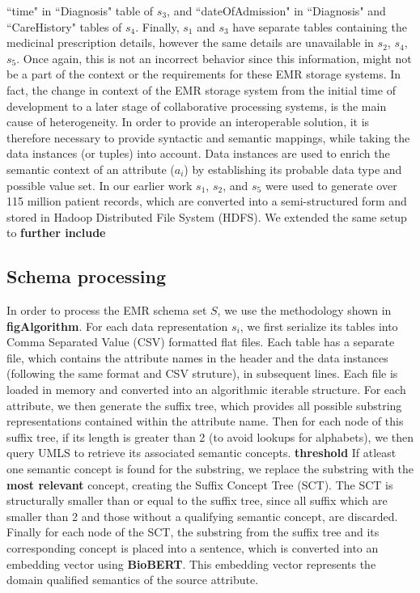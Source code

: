 ``time" in ``Diagnosis" table of $s_3$, and  ``dateOfAdmission" in ``Diagnosis" and ``CareHistory" tables of $s_4$.
Finally, $s_1$ and $s_3$ have separate tables containing the medicinal prescription details, however the same details are unavailable in $s_2$, $s_4$, $s_5$. Once again, this is not an incorrect behavior since this information, might not be a part of the context or the requirements for these EMR storage systems.
In fact, the change in context of the EMR storage system from the initial time of development to a later stage of collaborative processing systems, is the main cause of heterogeneity.
In order to provide an interoperable solution, it is therefore necessary to provide syntactic and semantic mappings, while taking the data instances (or tuples) into account. Data instances are used to enrich the semantic context of an attribute ($a_i$) by establishing its probable data type and possible value set. 
In our earlier work \cite{Satti2020} $s_1$, $s_2$, and $s_5$ were used to generate over 115 million patient records, which are converted into a semi-structured form and stored in Hadoop Distributed File System (HDFS). We extended the same setup to \textbf{further include}

\subsection*{Schema processing}
\label{schema_prepro}

In order to process the EMR schema set $S$, we use the methodology shown in \textbf{figAlgorithm}. For each data representation $s_i$, we first serialize its tables into Comma Separated Value (CSV) formatted flat files. Each table has a separate file, which contains the attribute names in the header and the data instances (following the same format and CSV struture), in subsequent lines. Each file is loaded in memory and converted into an algorithmic iterable structure. For each attribute, we then generate the suffix tree, which provides all possible substring representations contained within the attribute name. Then for each node of this suffix tree, if its length is greater than 2 (to avoid lookups for alphabets), we then query UMLS to retrieve its associated semantic concepts. \textbf{threshold}
If atleast one semantic concept is found for the substring, we replace the substring with the \textbf{most relevant} concept, creating the Suffix Concept Tree (SCT). The SCT is structurally smaller than or equal to the suffix tree, since all suffix which are smaller than 2 and those without a qualifying semantic concept, are discarded. Finally for each node of the SCT, the substring from the suffix tree and its corresponding concept is placed into a sentence, which is converted into an embedding vector using \textbf{BioBERT}. This embedding vector represents the domain qualified semantics of the source attribute.

